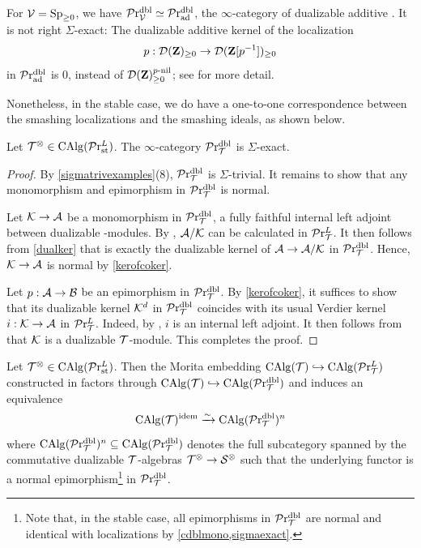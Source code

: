 \documentclass[10pt,a4paper,oneside]{article}
\begin{document}
\begin{ex}
For $\mathcal{V}=\operatorname{Sp}_{\geq0}$, we have $\mathcal{P}\mathrm{r}_{\mathcal{V}}^{\operatorname{dbl}} \simeq \mathcal{P}\mathrm{r}_{\operatorname{ad}}^{\operatorname{dbl}}$, the $\infty$-category of dualizable additive \infcats. It is not right $\Sigma$-exact: The dualizable additive kernel of the localization $$p:\mathcal{D}(\mathbf{Z})_{\geq0}\to \mathcal{D}(\mathbf{Z}[p^{-1}])_{\geq0}$$ in $\mathcal{P}\mathrm{r}_{\operatorname{ad}}^{\operatorname{dbl}}$ is $0$, instead of $\mathcal{D}(\mathbf{Z})_{\geq0}^{p\text{-nil}}$; see \cite{levy-liang-sosnilo:dualizable} for more detail.
\end{ex}

\begin{rem}
Nonetheless, in the stable case, we do have a one-to-one correspondence between the smashing localizations and the smashing ideals, as shown below.
\end{rem}

\begin{thm}\label{sigmaexact}
Let $\mathcal{T}^\otimes\in \operatorname{CAlg}(\mathcal{P}\mathrm{r}_{\operatorname{st}}^L)$. The $\infty$-category $\mathcal{P}\mathrm{r}_{\mathcal{T}}^{\operatorname{dbl}}$ is $\Sigma$-exact.
\end{thm}

\begin{proof}
By \cref{sigmatrivexamples}(8), $\mathcal{P}\mathrm{r}_{\mathcal{T}}^{\operatorname{dbl}}$ is $\Sigma$-trivial. It remains to show that any monomorphism and epimorphism in $\mathcal{P}\mathrm{r}_{\mathcal{T}}^{\operatorname{dbl}}$ is normal. 

Let $\mathcal{K}\to\mathcal{A}$ be a monomorphism in $\mathcal{P}\mathrm{r}_{\mathcal{T}}^{\operatorname{dbl}}$, \ie a fully faithful internal left adjoint between dualizable \mct-modules. By \cite[Proposition 1.62]{ramzi2024dualizable}, $\mathcal{A}/\mathcal{K}$ can be calculated in $\mathcal{P}\mathrm{r}^L_{\mathcal{T}}$. It then follows from \cref{dualker} that \mck is exactly the dualizable kernel of $\mathcal{A}\to\mathcal{A}/\mathcal{K}$ in $\mathcal{P}\mathrm{r}_{\mathcal{T}}^{\operatorname{dbl}}$. Hence, $\mathcal{K}\to\mathcal{A}$ is normal by \cref{kerofcoker}.

Let $p:\mathcal{A}\to \mathcal{B}$ be an epimorphism in $\mathcal{P}\mathrm{r}_{\mathcal{T}}^{\operatorname{dbl}}$. By \cref{kerofcoker}, it suffices to show that its dualizable kernel $\mathcal{K}^d$ in $\mathcal{P}\mathrm{r}_{\mathcal{T}}^{\operatorname{dbl}}$ coincides with its usual Verdier kernel $i:\mathcal{K} \to \mathcal{A}$ in $\mathcal{P}\mathrm{r}^L_{\mathcal{T}}$. Indeed, by \cite[Example~1.18]{ramzi2024dualizable}, $i$ is an internal left adjoint. It then follows from \cite[Theorem~1.49]{ramzi2024dualizable} that $\mathcal{K}$ is a dualizable $\mathcal{T}$-module. This completes the proof.
\end{proof}

\begin{cor}\label{idlfullyfai}
Let $\mathcal{T}^\otimes\in\operatorname{CAlg}(\mathcal{P}\mathrm{r}_{\operatorname{st}}^L)$. Then
the Morita embedding $\operatorname{CAlg}(\mathcal{T})\hookrightarrow \operatorname{CAlg}(\mathcal{P}\mathrm{r}^L_{\mathcal{T}})$ constructed in \cite[Corollary 4.8.5.21]{ha} factors through $\operatorname{CAlg}(\mathcal{T})\hookrightarrow \operatorname{CAlg}(\mathcal{P}\mathrm{r}_{\mathcal{T}}^{\operatorname{dbl}})$
and induces an equivalence $$%
\calg(\mct)^{\op{idem}}\xrightarrow{\sim}\calg(\lintdbl)^n$$
where $\operatorname{CAlg}(\mathcal{P}\mathrm{r}_{\mathcal{T}}^{\operatorname{dbl}})^n\subseteq\operatorname{CAlg}(\mathcal{P}\mathrm{r}_{\mathcal{T}}^{\operatorname{dbl}})$ denotes the full subcategory spanned by the commutative dualizable $\mathcal{T}$-algebras $\mathcal{T}^\otimes \to \mathcal{S}^\otimes$  such that the underlying functor is a normal epimorphism\footnote{Note that, in the stable case, all epimorphisms in $\mathcal{P}\mathrm{r}_{\mathcal{T}}^{\operatorname{dbl}}$ are normal and identical with localizations by \cref{cdblmono,sigmaexact}.} in $\mathcal{P}\mathrm{r}_{\mathcal{T}}^{\operatorname{dbl}}$.
\end{cor}
\end{document}
